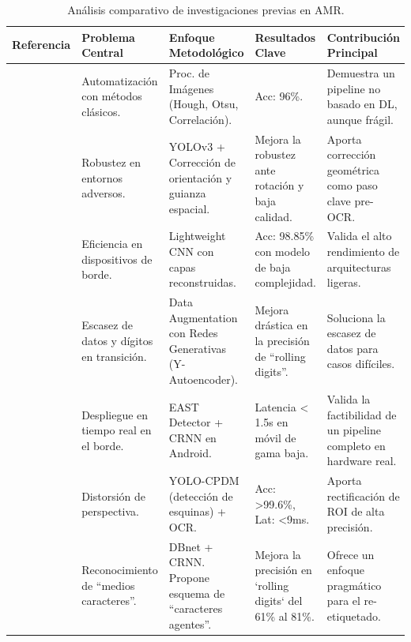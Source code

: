 \begin{table}[H]
    \centering
    \small %
    \caption{Análisis comparativo de investigaciones previas en AMR.}
    \label{tab:sota_comparison}
    \begin{singlespace}
    \begin{tabularx}{\textwidth}{
        >{\bfseries}p{2cm} 
        >{\raggedright\arraybackslash}X 
        >{\raggedright\arraybackslash}X 
        >{\raggedright\arraybackslash}X 
        >{\raggedright\arraybackslash}X
    }
        \toprule
        \textbf{Referencia} & \textbf{Problema Central} & \textbf{Enfoque Metodológico} & \textbf{Resultados Clave} & \textbf{Contribución Principal} \\
        \midrule
        \textcite{Chaki2019Automation} & Automatización con métodos clásicos. & Proc. de Imágenes (Hough, Otsu, Correlación). & Acc: 96\%. & Demuestra un pipeline no basado en DL, aunque frágil. \\
        \addlinespace
        \textcite{Hong2021ImageBased} & Robustez en entornos adversos. & YOLOv3 + Corrección de orientación y guianza espacial. & Mejora la robustez ante rotación y baja calidad. & Aporta corrección geométrica como paso clave pre-OCR. \\
        \addlinespace
        \textcite{Zou2021} & Eficiencia en dispositivos de borde. & Lightweight CNN con capas reconstruidas. & Acc: 98.85\% con modelo de baja complejidad. & Valida el alto rendimiento de arquitecturas ligeras. \\
        \addlinespace
        \textcite{Sripanuskul2022Generative} & Escasez de datos y dígitos en transición. & Data Augmentation con Redes Generativas (Y-Autoencoder). & Mejora drástica en la precisión de ``rolling digits''. & Soluciona la escasez de datos para casos difíciles. \\
        \addlinespace
        \textcite{Carvalho2023} & Despliegue en tiempo real en el borde. & EAST Detector + CRNN en Android. & Latencia < 1.5s en móvil de gama baja. & Valida la factibilidad de un pipeline completo en hardware real. \\
        \addlinespace
        \textcite{Peng2023Deep} & Distorsión de perspectiva. & YOLO-CPDM (detección de esquinas) + OCR. & Acc: >99.6\%, Lat: <9ms. & Aporta rectificación de ROI de alta precisión. \\
        \addlinespace
        \textcite{Shen2023} & Reconocimiento de ``medios caracteres''. & DBnet + CRNN. Propone esquema de ``caracteres agentes''. & Mejora la precisión en `rolling digits` del 61\% al 81\%. & Ofrece un enfoque pragmático para el re-etiquetado. \\

\end{tabularx}
\end{singlespace}
\end{table}
